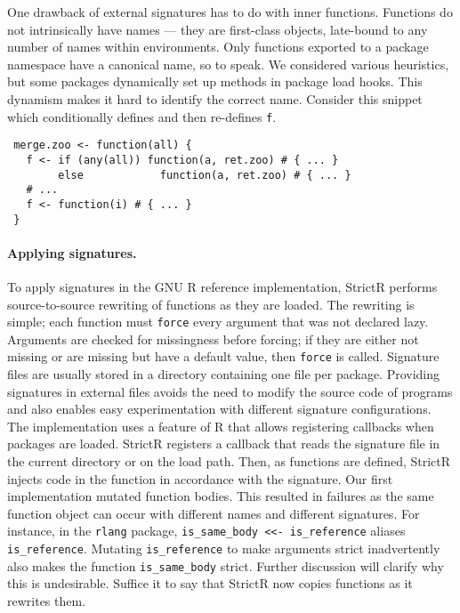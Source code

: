 \documentclass[review,nonacm,screen,acmsmall,anonymous=true]{acmart}
\newcommand{\code}[1]{\lstinline |#1|\xspace}
\renewcommand{\c}[1]{\lstinline |#1|\xspace}
\newcommand{\strictr}{{\sf StrictR}\xspace}
\begin{document}
One drawback of external signatures has to do with inner functions. Functions do
not intrinsically have names --- they are first-class objects, late-bound to any
number of names within environments. Only functions exported to a package
namespace have a canonical name, so to speak. We considered various heuristics,
but some packages dynamically set up methods in package load hooks. This dynamism
makes it hard to identify the correct name. Consider this snippet
which conditionally defines and then re-defines \c f.

\begin{lstlisting}
 merge.zoo <- function(all) {
   f <- if (any(all)) function(a, ret.zoo) # { ... }
        else            function(a, ret.zoo) # { ... }
   # ...
   f <- function(i) # { ... }
 }
\end{lstlisting}

\paragraph{Applying signatures.}
To apply signatures in the GNU R reference implementation, \strictr performs
source-to-source rewriting of functions as they are loaded. The rewriting is
simple; each function must \c{force} every argument that was not declared lazy.
Arguments are checked for missingness before forcing; if they are either not
missing or are missing but have a default value, then \c{force} is called.
Signature files are usually stored in a directory containing one file per
package. Providing signatures in external files avoids the need to modify the
source code of programs and also enables easy experimentation with different
signature configurations. The implementation uses a feature of R that allows
registering callbacks when packages are loaded. \strictr registers a callback
that reads the signature file in the current directory or on the load path.
Then, as functions are defined, \strictr injects code in the function in
accordance with the signature. Our first implementation mutated function bodies.
This resulted in failures as the same function object can occur with different
names and different signatures. For instance, in the \code{rlang} package,
\code{is_same_body <<- is_reference} aliases \code{is_reference}. Mutating
\code{is_reference} to make arguments strict inadvertently also makes the
function \code{is_same_body} strict. Further discussion will clarify why this is
undesirable. Suffice it to say that \strictr now copies functions as it rewrites
them.
\end{document}
